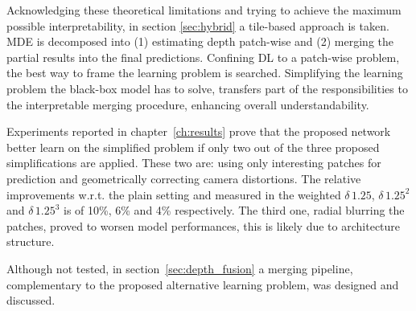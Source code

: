 Acknowledging these theoretical limitations and trying to achieve the maximum possible interpretability, in section \ref{sec:hybrid} a tile-based approach is taken.
MDE is decomposed into (1) estimating depth patch-wise and (2) merging the partial results into the final predictions.
Confining DL to a patch-wise problem, the best way to frame the learning problem is searched.
Simplifying the learning problem the black-box model has to solve, transfers part of the responsibilities to the interpretable merging procedure, enhancing overall understandability.

Experiments reported in chapter~\ref{ch:results} prove that the proposed network better learn on the simplified problem if only two out of the three proposed simplifications are applied.
These two are: using only interesting patches for prediction and geometrically correcting camera distortions.
The relative improvements w.r.t. the plain setting and measured in the weighted $\delta \, 1.25$, $\delta \, 1.25^{2}$ and $\delta \, 1.25^{3}$ is of 10\%, 6\% and 4\% respectively.
The third one, radial blurring the patches, proved to worsen model performances, this is likely due to architecture structure.

Although not tested, in section~\ref{sec:depth_fusion} a merging pipeline, complementary to the proposed alternative learning problem, was designed and discussed.

